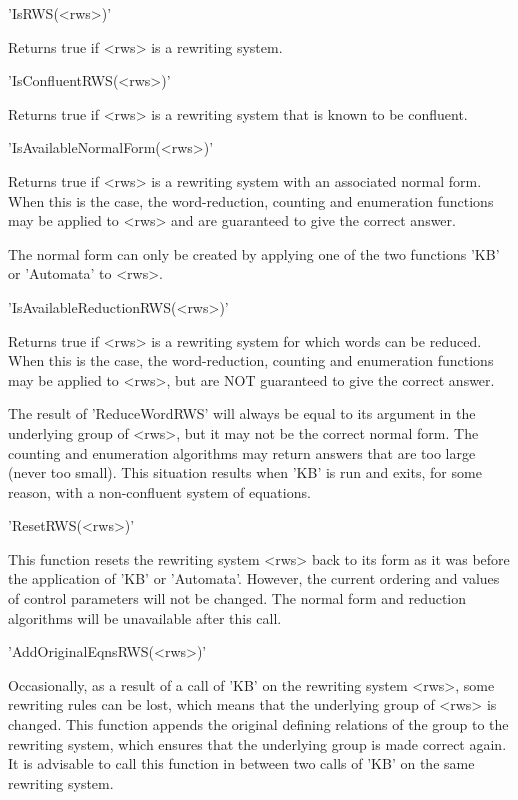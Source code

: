 'IsRWS(<rws>)'

Returns true if <rws> is a rewriting system.

'IsConfluentRWS(<rws>)'

Returns true if <rws> is a rewriting system that is known
to be confluent.

'IsAvailableNormalForm(<rws>)'

Returns true if <rws> is a rewriting  system with an associated normal
form.  When  this is    the  case, the  word-reduction,  counting  and
enumeration functions  may be applied to  <rws> and are  guaranteed to
give the correct answer.

The normal  form  can  only be  created  by  applying one of   the two
functions 'KB' or 'Automata' to <rws>.

'IsAvailableReductionRWS(<rws>)'

Returns true  if <rws> is a  rewriting system for  which words  can be
reduced.  When this   is the case,  the  word-reduction,  counting and
enumeration functions may be applied  to <rws>, but are NOT guaranteed
to give the correct answer.

The result of 'ReduceWordRWS' will always  be equal to its argument in
the underlying group of <rws>,  but it may not  be the correct  normal
form.  The counting and enumeration algorithms may return answers that
are too large (never too small).  This  situation results when 'KB' is
run and exits,   for  some reason,  with  a   non-confluent  system of
equations.

'ResetRWS(<rws>)'

This function resets the rewriting system <rws> back to its form as it
was before the application of 'KB' or 'Automata'. However, the current
ordering  and values  of control  parameters  will not be changed. The
normal form and  reduction algorithms will  be unavailable after  this
call.


'AddOriginalEqnsRWS(<rws>)'

Occasionally, as a result  of a call of  'KB' on the rewriting  system
<rws>, some   rewriting   rules can be  lost,   which  means  that the
underlying  group of  <rws>   is changed.  This function  appends  the
original defining relations of  the   group to the  rewriting  system,
which ensures  that the underlying group  is made correct again. It is
advisable  to call this function  in between two  calls of 'KB' on the
same rewriting system.

